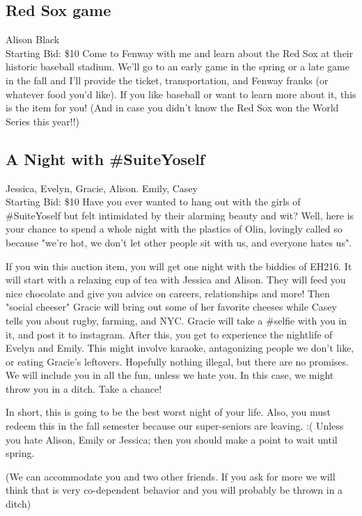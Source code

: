 \documentclass[11pt]{article}
\begin{document}
\subsection{Red Sox game}
Alison Black
\\
Starting Bid: \$10
\newline
Come to Fenway with me and learn about the Red Sox at their historic baseball stadium.  We'll go to an early game in the spring or a late game in the fall and I'll provide the ticket, transportation, and Fenway franks (or whatever food you'd like).  If you like baseball or want to learn more about it, this is the item for you!  (And in case you didn't know the Red Sox won the World Series this year!!)
\subsection{A Night with \#SuiteYoself}
Jessica, Evelyn, Gracie, Alison. Emily, Casey
\\
Starting Bid: \$10
\newline
Have you ever wanted to hang out with the girls of \#SuiteYoself but felt intimidated by their alarming beauty and wit? Well, here is your chance to spend a whole night with the plastics of Olin, lovingly called so because "we're hot, we don't let other people sit with us, and everyone hates us".

If you win this auction item, you will get one night with the biddies of EH216. It will start with a relaxing cup of tea with Jessica and Alison. They will feed you nice chocolate and give you advice on careers, relationships and more! Then "social cheeser" Gracie will bring out some of her favorite cheeses while Casey tells you about rugby, farming, and NYC. Gracie will take a \#selfie with you in it, and post it to instagram. After this, you get to experience the nightlife of Evelyn and Emily. This might involve karaoke, antagonizing people we don't like, or eating Gracie's leftovers. Hopefully nothing illegal, but there are no promises. We will include you in all the fun, unless we hate you. In this case, we might throw you in a ditch. Take a chance!

In short, this is going to be the best worst night of your life. Also, you must redeem this in the fall semester because our super-seniors are leaving. :( Unless you hate Alison, Emily or Jessica; then you should make a point to wait until spring.

(We can accommodate you and two other friends. If you ask for more we will think that is very co-dependent behavior and you will probably be thrown in a ditch)
\end{document}
